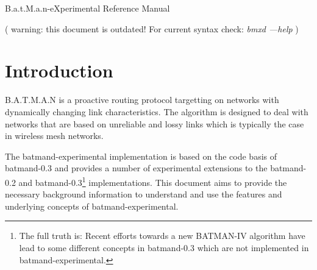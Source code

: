 \documentclass[11pt]{article}
\begin{document}




\begin{center}
{\huge

\noindent

B.a.t.M.a.n-eXperimental Reference Manual

\large
( warning: this document is outdated! For current syntax check: \emph{bmxd ---help} )



}
\end{center}




\tableofcontents


\section {Introduction}
\label{sec:introduction}

B.A.T.M.A.N is a proactive routing protocol targetting on networks with dynamically changing link characteristics.
%
%
The algorithm is designed to deal with networks that are based on unreliable and lossy links which is typically the case in wireless mesh networks.

The batmand-experimental implementation is based on the code basis of batmand-0.3 and provides a number of experimental extensions to the batmand-0.2 and batmand-0.3\footnote{The full truth is: Recent efforts towards a new BATMAN-IV algorithm have lead to some different concepts in batmand-0.3 which are not implemented in batmand-experimental.} implementations.
%
This document aims to provide the necessary background information to understand and use the features and underlying concepts of batmand-experimental.
\end{document}
